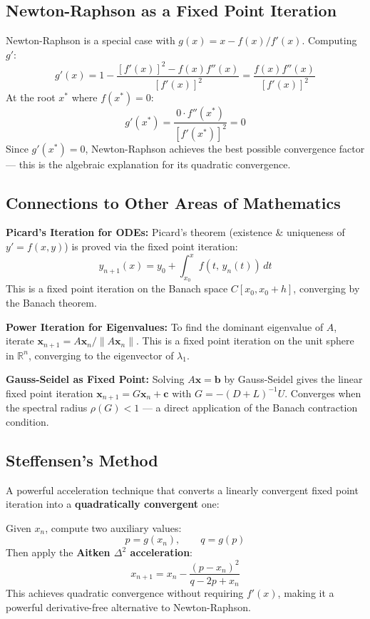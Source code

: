 \documentclass[12pt]{article}
\begin{document}
\subsection*{Newton-Raphson as a Fixed Point Iteration}

Newton-Raphson is a special case with $g(x)=x-f(x)/f'(x)$. Computing $g'$:
\[
  g'(x) = 1 - \frac{[f'(x)]^2 - f(x)f''(x)}{[f'(x)]^2} = \frac{f(x)f''(x)}{[f'(x)]^2}
\]
At the root $x^*$ where $f(x^*)=0$:
\[
  g'(x^*) = \frac{0 \cdot f''(x^*)}{[f'(x^*)]^2} = 0
\]
Since $g'(x^*)=0$, Newton-Raphson achieves the best possible convergence factor — this is the algebraic explanation for its quadratic convergence.

\subsection*{Connections to Other Areas of Mathematics}

\begin{keybox}
\textbf{Picard's Iteration for ODEs:} Picard's theorem (existence \& uniqueness of $y'=f(x,y)$) is proved via the fixed point iteration:
\[
  y_{n+1}(x) = y_0 + \int_{x_0}^x f(t,\,y_n(t))\,dt
\]
This is a fixed point iteration on the Banach space $C[x_0,x_0+h]$, converging by the Banach theorem.

\medskip
\textbf{Power Iteration for Eigenvalues:} To find the dominant eigenvalue of $A$, iterate $\mathbf{x}_{n+1}=A\mathbf{x}_n/\|A\mathbf{x}_n\|$. This is a fixed point iteration on the unit sphere in $\mathbb{R}^n$, converging to the eigenvector of $\lambda_1$.

\medskip
\textbf{Gauss-Seidel as Fixed Point:} Solving $A\mathbf{x}=\mathbf{b}$ by Gauss-Seidel gives the linear fixed point iteration $\mathbf{x}_{n+1}=G\mathbf{x}_n+\mathbf{c}$ with $G=-(D+L)^{-1}U$. Converges when the spectral radius $\rho(G)<1$ — a direct application of the Banach contraction condition.
\end{keybox}

\subsection*{Steffensen's Method}

A powerful acceleration technique that converts a linearly convergent fixed point iteration into a \textbf{quadratically convergent} one:

\begin{defbox}
Given $x_n$, compute two auxiliary values:
\[
  p = g(x_n), \qquad q = g(p)
\]
Then apply the \textbf{Aitken $\Delta^2$ acceleration}:
\[
  x_{n+1} = x_n - \frac{(p - x_n)^2}{q - 2p + x_n}
\]
This achieves quadratic convergence without requiring $f'(x)$, making it a powerful derivative-free alternative to Newton-Raphson.
\end{defbox}
\end{document}
